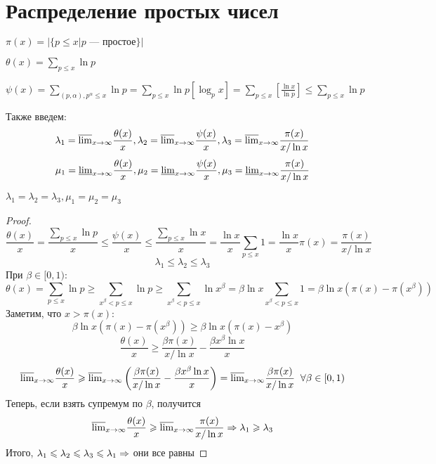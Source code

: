 
\section{Распределение простых чисел}
\begin{definition}
    \(\pi(x) = \left|\{p \le x | p\text{ --- простое}\}\right|\)
\end{definition}
\begin{definition}
    \(\theta(x) = \sum_{p \le x} \ln p\)
\end{definition}
\begin{definition}
    \(\psi(x) = \sum_{(p, \alpha), p^\alpha \le x} \ln p = \sum_{p \le x} \ln p [\log_p x] = \sum_{p \le x}\left[\frac{\ln x}{\ln p}\right] \le \sum_{p \le x} \ln p\)
\end{definition}

Также введем:
\[\lambda_1 = \overline{\lim}_{x \rightarrow \infty} \frac{\theta(x)}{x}, \lambda_2 = \overline{\lim}_{x \rightarrow \infty} \frac{\psi(x)}{x}, \lambda_3 = \overline{\lim}_{x \rightarrow \infty} \frac{\pi(x)}{x / \ln x}\]
\[\mu_1 = \underline{\lim}_{x \rightarrow \infty} \frac{\theta(x)}{x}, \mu_2 = \underline{\lim}_{x \rightarrow \infty} \frac{\psi(x)}{x}, \mu_3 = \underline{\lim}_{x \rightarrow \infty} \frac{\pi(x)}{x / \ln x}\]

\begin{lemma}
    \(\lambda_1 = \lambda_2 = \lambda_3, \mu_1 = \mu_2 = \mu_3\)
\end{lemma}
\begin{proof}
    \[\frac{\theta(x)}{x} = \frac{\sum_{p \le x}\ln p}{x} \le \frac{\psi(x)}{x} \le \frac{\sum_{p \le x} \ln x}{x} = \frac{\ln x}{x}\sum_{p \le x} 1 = \frac{\ln x}{x}\pi(x) = \frac{\pi(x)}{x/\ln x}\]
    \[\lambda_1 \le \lambda_2 \le \lambda_3\]
    При \(\beta \in [0, 1)\):
    \[\theta(x) = \sum_{p \le x} \ln p \ge \sum_{x^\beta < p \le x} \ln p \ge \sum_{x^\beta < p \le x} \ln x^\beta = \beta \ln x \sum_{x^\beta < p \le x} 1 = \beta\ln x\left(\pi(x) - \pi\left(x^\beta\right)\right)\]
    Заметим, что \(x > \pi(x)\):
    \[\beta\ln x\left(\pi(x) - \pi\left(x^\beta\right)\right) \ge \beta\ln x\left(\pi(x) - x^\beta\right)\]
    \[\frac{\theta(x)}{x} \ge \frac{\beta\pi(x)}{x / \ln x} - \frac{\beta x^\beta \ln x}{x}\]
    \[\overline{\lim}_{x \rightarrow \infty} \frac{\theta(x)}{x} \geqslant \overline{\lim}_{x \rightarrow \infty} \left(\frac{\beta\pi(x)}{x / \ln x} - \frac{\beta x^\beta \ln x}{x}\right) = \overline{\lim}_{x \rightarrow \infty} \frac{\beta \pi(x)}{x/\ln x} \;\;\forall \beta \in [0, 1)\]
    Теперь, если взять супремум по \(\beta\), получится 
    \[\overline{\lim}_{x \rightarrow \infty} \frac{\theta(x)}{x} \geqslant \overline{\lim}_{x \rightarrow \infty} \frac{\pi(x)}{x/\ln x} \Rightarrow \lambda_1 \geqslant \lambda_3\]
    Итого, \(\lambda_1 \leqslant \lambda_2 \leqslant \lambda_3 \leqslant \lambda_1 \Rightarrow\) они все равны
\end{proof}

